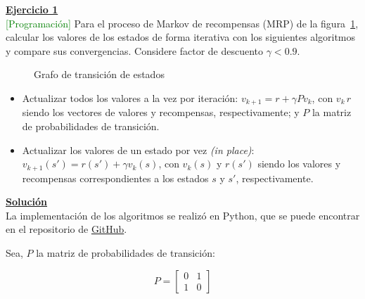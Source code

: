 \indent\underline{\textbf{Ejercicio 1}}\\
\textcolor{green}{[Programación]} Para el proceso de Markov de recompensas (MRP) de la figura~\ref{fig:grafo_ej_1}, calcular los valores de los estados de forma iterativa con los siguientes algoritmos y compare sus convergencias.
Considere factor de descuento $\gamma < 0.9$.\\

\begin{figure}[H]
    \centering
    \caption{Grafo de transición de estados}\label{fig:grafo_ej_1}
\end{figure}


\begin{itemize}
    \item Actualizar todos los valores a la vez por iteración: $v_{k+1} = r + \gamma P v_k$, con $v_k\, r$ siendo los vectores de valores y recompensas, respectivamente; y $P$ la matriz de probabilidades de transición.
    \item Actualizar los valores de un estado por vez \textit{(in place)}: $v_{k+1}(s') = r(s') + \gamma v_k(s)$, con $v_k(s)$ y $r(s')$ siendo los valores y recompensas correspondientes a los estados $s$ y $s'$, respectivamente.
\end{itemize}

\indent\underline{\textbf{Solución}}\\
La implementación de los algoritmos se realizó en Python, que se puede encontrar en el repositorio de \href{https://github.com/MasterUBA-DM-KD/Aprendizaje_Reforzado/blob/5ae50da937b14f0a11c416e40019a4b5661dd51b/docs/guia/3/notebooks/utils.py}{GitHub}.

Sea, $P$ la matriz de probabilidades de transición:

\[
  P = \begin{bmatrix} 0 & 1 \\ 1 & 0 \end{bmatrix}
\]

